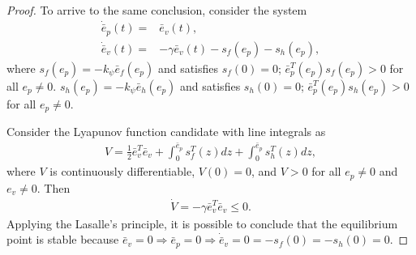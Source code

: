 \begin{proof}
To arrive to the same conclusion, consider the system
\begin{align*}
\dot{\bar{e}}_p(t)  = &\bar{e}_v(t), \\
\dot{\bar{e}}_v(t)  = &-\gamma \bar{e}_v(t) - s_f(e_p) - s_h(e_p),
\end{align*}
where  $s_f(e_p)=- k_{\psi}\bar{e}_f(e_p)$  and satisfies $s_f(0)=0$; $\bar{e}_p^T(e_p)s_f(e_p) > 0$ for all $e_p \neq 0$. 
$s_h(e_p)=- k_{\psi}\bar{e}_h(e_p)$  and satisfies $s_h(0)=0$; $\bar{e}_p^T(e_p)s_h(e_p) > 0$ for all $e_p \neq 0$.

Consider the Lyapunov function candidate with line integrals as
\begin{align}
 V=\frac{1}{2}\bar{e}_v^T\bar{e}_v + \int_0^{\bar{e}_p} s_f^T(z)dz + \int_0^{\bar{e}_p} s_h^T(z)dz,
\end{align}
where $V$ is continuously differentiable,  $V(0)=0$, and $V>0$ for all $e_p \neq0$ and $e_v \neq 0$. Then  
\begin{align}
\dot{V}=-\gamma \bar{e}_v^T\bar{e}_v \leq 0.
\end{align}
Applying the Lasalle's principle, it is possible to conclude that the equilibrium point is stable because  $\bar{e}_v=0 \Rightarrow \bar{e}_p=0\Rightarrow \dot{\bar{e}}_v=0=-s_f(0)=-s_h(0)=0$.  %
\end{proof}





